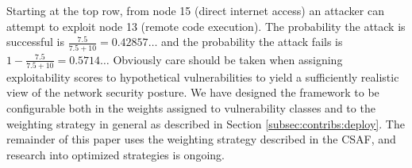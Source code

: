 
Starting at the top row, from node 15 (direct internet access) an attacker can attempt to exploit node 13 (remote code execution). The probability the attack is successful is $\frac{7.5}{7.5 + 10}=0.42857\dots$ and the probability the attack fails is $1 - \frac{7.5}{7.5 + 10} = 0.5714\dots$ Obviously care should be taken when assigning exploitability scores to hypothetical vulnerabilities to yield a sufficiently realistic view of the network security posture. We have designed the framework to be configurable both in the weights assigned to vulnerability classes and to the weighting strategy in general as described in Section \ref{subsec:contribs:deploy}. The remainder of this paper uses the weighting strategy described in the CSAF, and research into optimized strategies is ongoing. 


